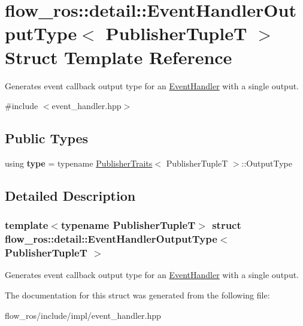 \hypertarget{structflow__ros_1_1detail_1_1_event_handler_output_type}{}\section{flow\+\_\+ros\+:\+:detail\+:\+:Event\+Handler\+Output\+Type$<$ Publisher\+TupleT $>$ Struct Template Reference}
\label{structflow__ros_1_1detail_1_1_event_handler_output_type}


Generates event callback output type for an \hyperlink{classflow__ros_1_1_event_handler}{Event\+Handler} with a single output.  




{\ttfamily \#include $<$event\+\_\+handler.\+hpp$>$}

\subsection*{Public Types}
\begin{DoxyCompactItemize}
\item 
\mbox{\label{structflow__ros_1_1detail_1_1_event_handler_output_type_a4f1b96df4f12596bd3ae2991a1335c26}} 
using {\bfseries type} = typename \hyperlink{structflow__ros_1_1_publisher_traits}{Publisher\+Traits}$<$ Publisher\+TupleT $>$\+::Output\+Type
\end{DoxyCompactItemize}


\subsection{Detailed Description}
\subsubsection*{template$<$typename Publisher\+TupleT$>$\newline
struct flow\+\_\+ros\+::detail\+::\+Event\+Handler\+Output\+Type$<$ Publisher\+Tuple\+T $>$}

Generates event callback output type for an \hyperlink{classflow__ros_1_1_event_handler}{Event\+Handler} with a single output. 

The documentation for this struct was generated from the following file\+:\begin{DoxyCompactItemize}
\item 
flow\+\_\+ros/include/impl/event\+\_\+handler.\+hpp\end{DoxyCompactItemize}
